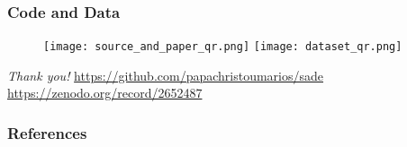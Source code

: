 \documentclass{beamer}
\begin{document}
\begin{frame}
\frametitle{Code and Data} 

\begin{figure}
\centering
\texttt{[image: source\_and\_paper\_qr.png]} \qquad
\texttt{[image: dataset\_qr.png]}
\end{figure}

\centering \Large {
  \emph{Thank you!}}
  \url{https://github.com/papachristoumarios/sade}
  \url{https://zenodo.org/record/2652487}

\end{frame}


\begin{frame}[allowframebreaks]
\frametitle{References}


\end{frame}
 

 
 
\end{document}
